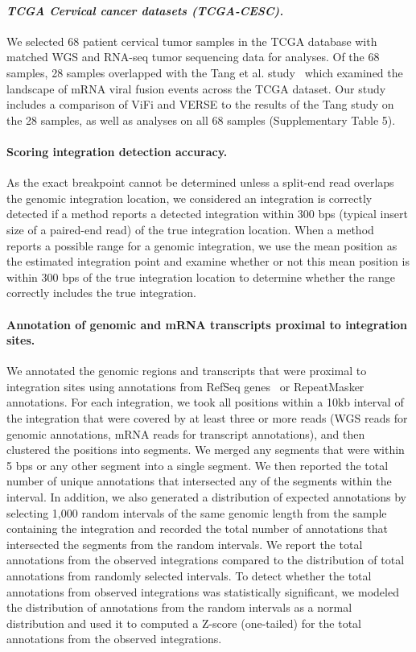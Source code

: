 \documentclass{bmcart}
\begin{document}
\paragraph{\emph{TCGA Cervical cancer datasets (TCGA-CESC).}}
We selected 68 patient cervical tumor samples in the TCGA database with matched WGS and RNA-seq tumor sequencing data for analyses.  Of the 68 samples, 28 samples overlapped with the Tang et al. study~\cite{Tang2013} which examined the landscape of mRNA viral fusion events across the TCGA dataset.  Our study includes a comparison of ViFi and VERSE to the results of the Tang study on the 28 samples, as well as analyses on all 68 samples (Supplementary Table 5).

\paragraph{\textbf{Scoring integration detection accuracy.}}
As the exact breakpoint cannot be determined unless a split-end read overlaps the genomic integration location, we considered an integration is correctly detected if a method reports a detected integration within 300 bps (typical insert size of a paired-end read) of the true integration location.  When a method reports a possible range for a genomic integration, we use the mean position as the estimated integration point and examine whether or not this mean position is within 300 bps of the true integration location to determine whether the range correctly includes the true integration.

\paragraph{\textbf{Annotation of genomic and mRNA transcripts proximal to integration sites.}}
We annotated the genomic regions and transcripts that were proximal to integration
sites using annotations from RefSeq genes~\cite{OLeary2016} or
RepeatMasker~\cite{Tarailo-Graovac2009} annotations.  For each integration,
we took all positions within a 10kb interval of the integration that were 
covered by at least three or more reads (WGS reads for genomic annotations,
mRNA reads for transcript annotations), and then clustered the positions
into segments.  We merged any segments that were within 5 bps or any other
segment into a single segment.  We then reported the total number of unique annotations that intersected
any of the segments within the interval.  In addition, we also generated a distribution
of expected annotations by selecting 1,000 random intervals of the same genomic length from the sample 
containing the integration and recorded the total number of annotations that intersected the segments from 
the random intervals.  We report the total annotations from the observed integrations
compared to the distribution of total annotations from randomly selected intervals.  To detect whether the total annotations from observed integrations was statistically significant, we modeled the distribution of annotations from the random intervals as a normal distribution and used it to computed a Z-score (one-tailed) for the total annotations from the observed integrations.
\end{document}
